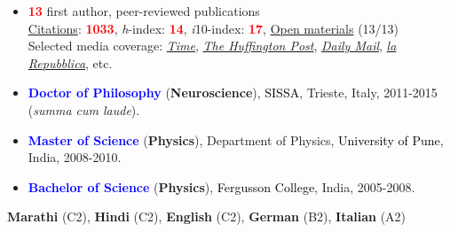 \documentclass[10pt]{article}
\begin{document}
	\begin{itemize}
	\item \textbf{\textcolor{red}{13}} first author, peer-reviewed publications\\
	
	\href{https://scholar.google.it/citations?user=kSYuYTUAAAAJ&hl=en&oi=ao}{Citations}: \textbf{\textcolor{red}{1033}}, \textit{h}-index: \textbf{\textcolor{red}{14}}, \textit{i}10-index: \textbf{\textcolor{red}{17}}, \href{https://osf.io/hk5f3/}{Open materials} (13/13)\\
	
	Selected media coverage: \href{http://time.com/3242/driving-over-your-best-friend-its-the-right-thing-to-do/}{\textit{Time}}, \href{http://www.huffingtonpost.com/entry/autism-empathy-brain-research_us_56f92575e4b014d3fe237413}{\textit{The Huffington Post}}, \href{http://www.dailymail.co.uk/sciencetech/article-4308284/Virtual-reality-experiment-puts-altruism-test.html}{\textit{Daily Mail}}, \href{http://www.repubblica.it/scienze/2017/04/11/news/area_cervello_perdono-162669836/?rss}{\textit{la Repubblica}}, etc.
	
     \end{itemize}

	
	\begin{itemize}	
	
	\itemsep-0.1em
	\item \textbf{\textcolor{blue}{Doctor of Philosophy}} (\textbf{Neuroscience}), \textcolor{black}{SISSA}, Trieste, Italy, 2011-2015 (\textit{summa cum laude}).

	\item \textbf{\textcolor{blue}{Master of Science}} (\textbf{Physics}), Department of Physics, \textcolor{black}{University of Pune}, India, 2008-2010.%
	
	\item \textbf{\textcolor{blue}{Bachelor of Science}} (\textbf{Physics}), \textcolor{black}{Fergusson College}, India, 2005-2008.%

    \end{itemize}

	\textbf{Marathi} (C2), \textbf{Hindi} (C2), \textbf{English} (C2), \textbf{German} (B2), \textbf{Italian} (A2)
	
\end{document}
